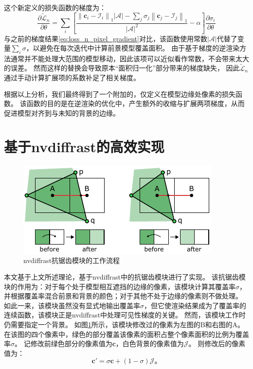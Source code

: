 这个新定义的损失函数的梯度为：
\begin{equation}
\frac{\partial\tilde{\mathcal{L}}_n}{\partial\theta} =
\sum_{i}\left[
    \frac{
        \textstyle \left\| \mathbf{c}_i - \mathcal{I}_i \right\|_1 |\mathcal{A}| -
        \textstyle \sum_j \sigma_j \left\| \mathbf{c}_j - \mathcal{I}_j \right\|_1
    }{|\mathcal{A}|^2} - \alpha
\right]\frac{\partial\sigma_i}{\partial\theta}
\end{equation}
与之前的梯度结果\eqref{eq:loss_n_pixel_gradient}对比，该函数使用常数$|\mathcal{A}|$代替了变量$\sum_{i} \sigma$，以避免在每次迭代中计算前景模型覆盖面积。
由于基于梯度的逆渲染方法通常并不能处理大范围的模型移动，因此该项可以近似看作常数，不会带来太大的误差。
然而这样的替换会导致原本“面积归一化”部分带来的梯度缺失，
因此$\tilde{\mathcal{L}}_n$通过手动计算扩展项的系数补足了相关梯度。

根据以上分析，我们最终得到了一个附加的，仅定义在模型边缘处像素的损失函数。
该函数的目的是在逆渲染的优化中，产生额外的收缩与扩展两项梯度，从而促进模型对齐到与未知的背景的边缘。

\section{基于nvdiffrast的高效实现}
\label{sec:method_nvdiffrast}

\begin{figure}[ht]
    \centering
    \includegraphics{figures/antialias}
    \caption[nvdiffrast抗锯齿模块的工作流程]{nvdiffrast抗锯齿模块的工作流程\citep{nvdiffrast}}
    \label{fig:aa}
\end{figure}
本文基于上文所述理论，基于nvdiffrast\citep{nvdiffrast}中的抗锯齿模块进行了实现。
该抗锯齿模块的作用为：对于每个处于模型相互遮挡的边缘的像素，该模块计算其覆盖率$\sigma$，并根据覆盖率混合前景和背景的颜色；对于其他不处于边缘的像素则不做处理。
如此一来，该模块虽然没有显式地输出覆盖率$\sigma$，但它使渲染结果成为了覆盖率的连续函数，该模块正是nvdiffrast中处理可见性梯度的关键。
然而，该模块工作时仍需要指定一个背景。
如图\ref{fig:aa}所示，该模块修改过的像素为左图的B和右图的A。
在该图的四个像素中，绿色的部分覆盖该像素的面积占整个像素面积的比例为覆盖率$\sigma$。
记修改前绿色部分的像素值为$\mathbf{c}$，白色背景的像素值为$\mathcal{J}$。
则修改后的像素值为：
\begin{equation}
\mathbf{c}' = \sigma\mathbf{c} + (1-\sigma)\mathcal{J}
\text{。}
\end{equation}

